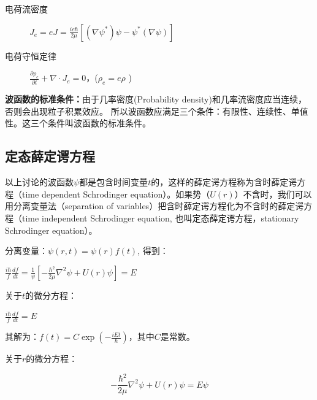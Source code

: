\begin{description}
    \item[电荷流密度] $J_e  = eJ = \frac{{ie\hbar }}{{2\mu }}\left[ {\left( {\nabla \psi ^* } \right)\psi  - \psi ^* \left( {\nabla \psi } \right)} \right]$
    \item[电荷守恒定律] $\frac{{\partial \rho_e }}{{\partial t}} + \nabla  \cdot J_e  = 0$，($\rho_e  = e\rho$
)
   \end{description}


\textbf{波函数的标准条件：}由于几率密度(Probability
density)和几率流密度应当连续，否则会出现粒子积累效应。
所以波函数应满足三个条件：有限性、连续性、单值性。这三个条件叫波函数的标准条件。



\subsection{定态薛定谔方程}

以上讨论的波函数$\psi$都是包含时间变量$t$的，这样的薛定谔方程称为含时薛定谔方程（time
dependent Schrodinger
equation）。如果势（$U(r)$）不含时，我们可以用分离变量法（separation
of variables）把含时薛定谔方程化为不含时的薛定谔方程（time
independent Schrodinger equation, 也叫定态薛定谔方程，stationary
Schrodinger equation）。

分离变量：$\psi (r,t) = \psi (r)f(t)$, 得到：


\begin{center}
$\frac{{i\hbar }}{f}\frac{{df}}{{dt}} = \frac{1}{\psi }\left[ { - \frac{{\hbar ^2 }}{{2\mu }}\nabla ^2 \psi  + U(r)\psi } \right] = E$
\end{center}

关于$t$的微分方程：

\begin{center}
$\frac{{i\hbar }}{f}\frac{{df}}{{dt}} = E$
\end{center}

其解为：$f(t) = C\exp \left( { - \frac{{iEt}}{\hbar }} \right)$，其中$C$是常数。

关于$r$的微分方程：

\begin{center}
\begin{equation}\label{stationary schordinger eq}
    - \frac{{\hbar ^2 }}{{2\mu }}\nabla ^2 \psi  + U(r)\psi  = E\psi
\end{equation}
\end{center}

